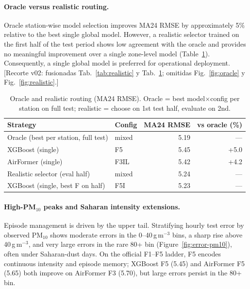 \documentclass[11pt]{article}
\newcommand{\revnew}[1]{\textcolor{orange!75!black}{#1}}
\begin{document}
\paragraph{Oracle versus realistic routing.}
Oracle station-wise model selection improves MA24 RMSE by approximately 5\% relative to the best single global model. However, a realistic selector trained on the first half of the test period shows low agreement with the oracle and provides no meaningful improvement over a single zone-level model (Table~\ref{tab:oracle}). Consequently, a single global model is preferred for operational deployment. \revnew{[Recorte v02: fusionadas Tab.~\ref{tab:realistic} y Tab.~\ref{tab:oracle}; omitidas Fig.~\ref{fig:oracle} y Fig.~\ref{fig:realistic}.]}

\begin{table}[H]
\centering
\caption{\revnew{Oracle and realistic routing (MA24 RMSE). Oracle = best model$\times$config per station on full test; realistic = choose on 1st test half, evaluate on 2nd.}}
\label{tab:oracle}
\small
\begin{tabular}{@{}llrr@{}}
\toprule
Strategy & Config & MA24 RMSE & vs oracle (\%) \\
\midrule
Oracle (best per station, full test) & mixed & 5.19 & --- \\
XGBoost (single) & F5 & 5.45 & +5.0 \\
AirFormer (single) & F3IL & 5.42 & +4.2 \\
Realistic selector (eval half) & mixed & 5.24 & --- \\
XGBoost (single, best F on half) & F5I & 5.23 & --- \\
\bottomrule
\end{tabular}
\end{table}

\paragraph{High-PM$_{10}$ peaks and Saharan intensity extensions.}
\label{sec:results-peaks}
Episode management is driven by the upper tail. Stratifying hourly test error by observed PM$_{10}$ shows moderate errors in the 0--40\,\textmu g\,m$^{-3}$ bins, a sharp rise above 40\,\textmu g\,m$^{-3}$, and very large errors in the rare 80+ bin (Figure~\ref{fig:error-pm10}), often under Saharan-dust days. On the official F1--F5 ladder, F5 encodes continuous intensity and episode memory; XGBoost F5 (5.45) and AirFormer F5 (5.65) both improve on AirFormer F3 (5.70), but large errors persist in the 80+ bin.
\end{document}
